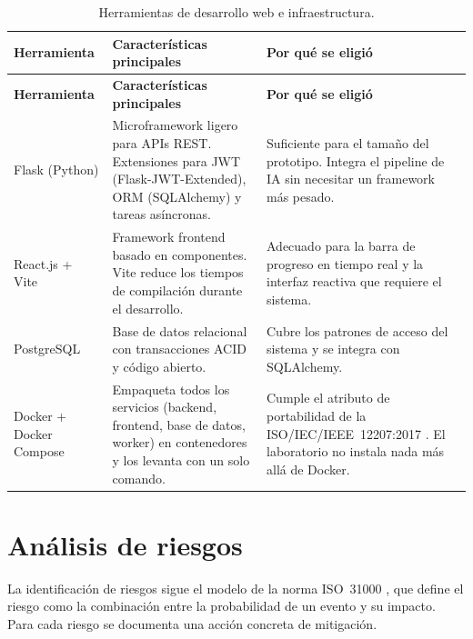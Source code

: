 \begin{longtable}{|p{2.3cm}|p{5.4cm}|p{5.4cm}|}
\caption{Herramientas de desarrollo web e infraestructura.
\label{tab:herr_web}}\\
\hline
\textbf{Herramienta} & \textbf{Características principales} & \textbf{Por qué se eligió} \\
\hline
\endfirsthead
\hline
\textbf{Herramienta} & \textbf{Características principales} & \textbf{Por qué se eligió} \\
\hline
\endhead
\hline
\endfoot

Flask (Python) \cite{grinberg2018}
    & Microframework ligero para APIs REST. Extensiones para JWT
      (Flask-JWT-Extended), ORM (SQLAlchemy) y tareas asíncronas.
    & Suficiente para el tamaño del prototipo. Integra el pipeline de IA sin
      necesitar un framework más pesado. \\
\hline
React.js + Vite
    & Framework frontend basado en componentes. Vite reduce los tiempos de
      compilación durante el desarrollo.
    & Adecuado para la barra de progreso en tiempo real y la interfaz reactiva
      que requiere el sistema. \\
\hline
PostgreSQL
    & Base de datos relacional con transacciones ACID y código abierto.
    & Cubre los patrones de acceso del sistema y se integra con SQLAlchemy. \\
\hline
Docker + Docker Compose \cite{merkel2014}
    & Empaqueta todos los servicios (backend, frontend, base de datos, worker) en
      contenedores y los levanta con un solo comando.
    & Cumple el atributo de portabilidad de la ISO/IEC/IEEE~12207:2017
      \cite{iso12207}. El laboratorio no instala nada más allá de Docker. \\
\hline

\end{longtable}

\section{Análisis de riesgos}

La identificación de riesgos sigue el modelo de la norma ISO~31000 \cite{iso31000}, que
define el riesgo como la combinación entre la probabilidad de un evento y su impacto.
Para cada riesgo se documenta una acción concreta de mitigación.

